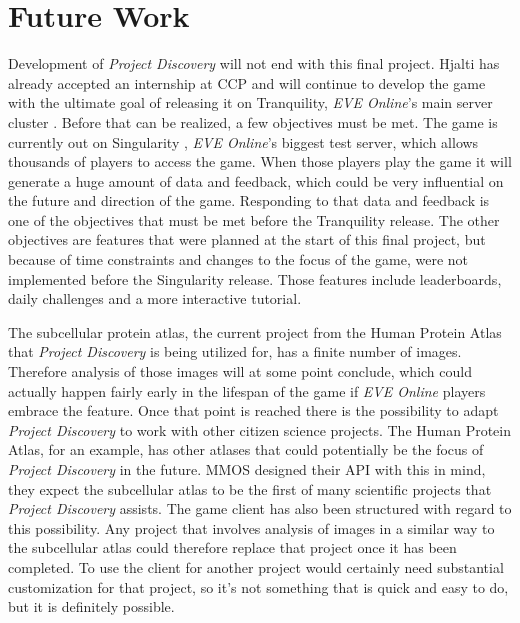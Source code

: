 \section{Future Work}\label{sec:futurework}
Development of \emph{Project Discovery} will not end with this final project. Hjalti has already accepted an internship at CCP and will continue to develop the game with the ultimate goal of releasing it on Tranquility, \emph{EVE Online}'s main server cluster \cite{tranquility}. Before that can be realized, a few objectives must be met. The game is currently out on Singularity \cite{singularity}, \emph{EVE Online}'s biggest test server, which allows thousands of players to access the game. When those players play the game it will generate a huge amount of data and feedback, which could be very influential on the future and direction of the game. Responding to that data and feedback is one of the objectives that must be met before the Tranquility release. The other objectives are features that were planned at the start of this final project, but because of time constraints and changes to the focus of the game, were not implemented before the Singularity release. Those features include leaderboards, daily challenges and a more interactive tutorial. 

The subcellular protein atlas, the current project from the Human Protein Atlas that \emph{Project Discovery} is being utilized for, has a finite number of images. Therefore analysis of those images will at some point conclude, which could actually happen fairly early in the lifespan of the game if \emph{EVE Online} players embrace the feature. Once that point is reached there is the possibility to adapt \emph{Project Discovery} to work with other citizen science projects. The Human Protein Atlas, for an example, has other atlases that could potentially be the focus of \emph{Project Discovery} in the future. MMOS designed their API with this in mind, they expect the subcellular atlas to be the first of many scientific projects that \emph{Project Discovery} assists. The game client has also been structured with regard to this possibility. Any project that involves analysis of images in a similar way to the subcellular atlas could therefore replace that project once it has been completed. To use the client for another project would certainly need substantial customization for that project, so it's not something that is quick and easy to do, but it is definitely possible.